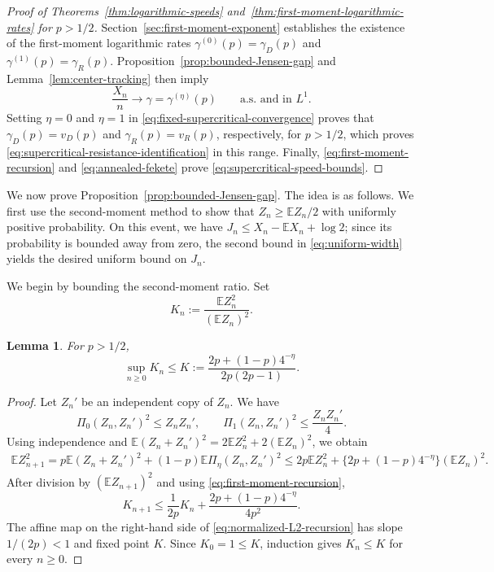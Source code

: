 \documentclass[12pt,preprint]{amsart}
\numberwithin{equation}{section}
\theoremstyle{plain}
\newtheorem{lemma}[theorem]{Lemma}
\theoremstyle{definition}
\newcommand{\E}{\mathbb E}
\begin{document}
\begin{proof}[Proof of Theorems~\ref{thm:logarithmic-speeds}
and~\ref{thm:first-moment-logarithmic-rates} for $p>1/2$]
Section~\ref{sec:first-moment-exponent} establishes the existence of the
first-moment logarithmic rates $\gamma^{(0)}(p)=\gamma_D(p)$ and
$\gamma^{(1)}(p)=\gamma_R(p)$.
Proposition~\ref{prop:bounded-Jensen-gap} and
Lemma~\ref{lem:center-tracking} then imply
\begin{equation}
 \frac{X_n}{n}\longrightarrow \gamma=\gamma^{(\eta)}(p)
 \qquad\text{a.s. and in }L^1.
\label{eq:fixed-supercritical-convergence}
\end{equation}
Setting $\eta=0$ and $\eta=1$ in
\eqref{eq:fixed-supercritical-convergence} proves that
$\gamma_D(p)=v_D(p)$ and $\gamma_R(p)=v_R(p)$, respectively, for $p>1/2$,
which proves
\eqref{eq:supercritical-resistance-identification} in this range.  Finally,
\eqref{eq:first-moment-recursion} and
\eqref{eq:annealed-fekete} prove
\eqref{eq:supercritical-speed-bounds}.
\end{proof}

We now prove Proposition~\ref{prop:bounded-Jensen-gap}.  The idea is as follows.
We first use the
second-moment method to show that $Z_n\ge\E Z_n/2$ with uniformly positive
probability.  On this
event, we have $J_n\le X_n-\E X_n+\log2$; since its probability is bounded away from
zero, the second bound in \eqref{eq:uniform-width} yields the desired uniform
bound on $J_n$.

We begin by bounding the second-moment ratio.  Set
\[
 K_n:=\frac{\E Z_n^2}{(\E Z_n)^2}.
\]

\begin{lemma}
\label{lem:normalized-L2}
For $p>1/2$,
\begin{equation*}
\sup_{n\ge0}K_n
 \le K
 :=\frac{2p+(1-p)4^{-\eta}}{2p(2p-1)}.
\end{equation*}
\end{lemma}

\begin{proof}
Let $Z_n'$ be an independent copy of $Z_n$.  We have
\[
 \Pi_0(Z_n,Z_n')^2\le Z_nZ_n',
 \qquad
 \Pi_1(Z_n,Z_n')^2\le\frac{Z_nZ_n'}{4}.
\]
Using independence and
$\E(Z_n+Z_n')^2=2\E Z_n^2+2(\E Z_n)^2$, we obtain
\begin{align*}
    \E Z_{n+1}^2=p\E(Z_n+Z_n')^2+(1-p)\E\Pi_\eta(Z_n,Z_n')^2
    \le 2p\E Z_n^2+\{2p+(1-p)4^{-\eta}\}(\E Z_n)^2.
\end{align*}
After division by $(\E Z_{n+1})^2$ and using
\eqref{eq:first-moment-recursion},
\begin{equation}
 K_{n+1}
 \le\frac1{2p}K_n
 +\frac{2p+(1-p)4^{-\eta}}{4p^2}.
 \label{eq:normalized-L2-recursion}
\end{equation}
The affine map on the right-hand side of
\eqref{eq:normalized-L2-recursion} has slope $1/(2p)<1$ and fixed point $K$.
Since $K_0=1\le K$, induction gives $K_n\le K$ for every $n\ge0$.
\end{proof}
\end{document}
